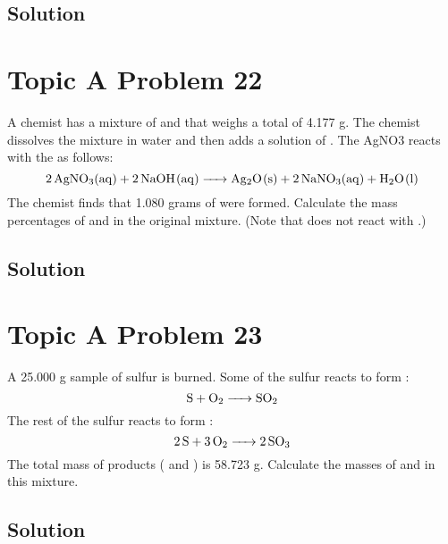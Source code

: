 \documentclass[10pt]{article}
\begin{document}
        \subsection{Solution}

    \pagebreak
    \section{Topic A Problem 22}
        A chemist has a mixture of  and  that weighs a total of 4.177 g. 
        The chemist dissolves the mixture in water and then adds a solution of . 
        The AgNO3 reacts with the  as follows:
        \begin{equation}
            \ce{2 AgNO3(aq) + 2 NaOH(aq) -> Ag2O(s) + 2 NaNO3(aq) + H2O(l)}
        \end{equation}
        The chemist finds that 1.080 grams of  were formed. 
        Calculate the mass percentages of  and  in the original mixture. 
        (Note that  does not react with .)

        \subsection{Solution}

    \pagebreak
    \section{Topic A Problem 23}
        A 25.000 g sample of sulfur is burned. 
        Some of the sulfur reacts to form :
        \begin{equation}
            \ce{S + O2 -> SO2}
        \end{equation}
        The rest of the sulfur reacts to form :
        \begin{equation}
            \ce{2 S + 3 O2 -> 2 SO3}
        \end{equation}
        The total mass of products ( and ) is 58.723 g. 
        Calculate the masses of  and  in this mixture.

        \subsection{Solution}

\end{document}
